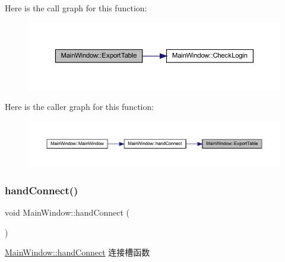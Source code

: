 Here is the call graph for this function\+:
\nopagebreak
\begin{figure}[H]
\begin{center}
\leavevmode
\includegraphics[width=350pt]{class_main_window_af225d8bd24ccc47792010109b928f6ba_cgraph}
\end{center}
\end{figure}
Here is the caller graph for this function\+:
\nopagebreak
\begin{figure}[H]
\begin{center}
\leavevmode
\includegraphics[width=350pt]{class_main_window_af225d8bd24ccc47792010109b928f6ba_icgraph}
\end{center}
\end{figure}
\mbox{\label{class_main_window_ad253da665707b1e03f610b2dea97976e}} 
\subsubsection{\texorpdfstring{handConnect()}{handConnect()}}
{\footnotesize\ttfamily void Main\+Window\+::hand\+Connect (\begin{DoxyParamCaption}{ }\end{DoxyParamCaption})}



\mbox{\hyperlink{class_main_window_ad253da665707b1e03f610b2dea97976e}{Main\+Window\+::hand\+Connect}} 连接槽函数 


